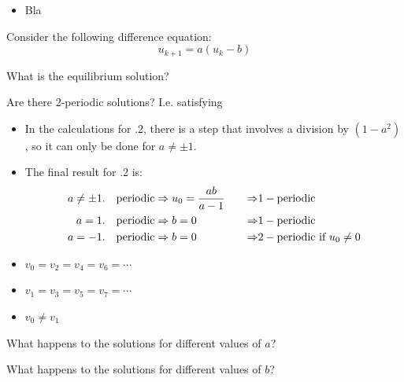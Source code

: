 \begin{lesson}

	\begin{itemize}
		\item Bla
	\end{itemize}
	

\end{lesson}




\question 
	Consider the following difference equation:
		$$u_{k+1} = a(u_k - b)$$

	\begin{parts}
		\item What is the equilibrium solution?
		\item Are there 2-periodic solutions? I.e. satisfying
\begin{annotation}
	\begin{goals}
		\begin{itemize}
			\item In the calculations for .2, there is a step that involves a division by $(1-a^2)$, so it can only be done for $a \neq \pm 1$.
			\item The final result for .2 is:
			\begin{align*}
				a \neq \pm1. & \quad {\rm periodic} \Rightarrow u_0 = \frac{ab}{a-1} \quad & \Rightarrow & 1-{\rm periodic} \\
				a = 1. & \quad {\rm periodic} \Rightarrow b=0  & \Rightarrow & 1-{\rm periodic} \\
				a = -1. & \quad {\rm periodic} \Rightarrow b=0  & \Rightarrow & 2-\text{periodic if } u_0\neq 0
			\end{align*}
		\end{itemize}
	\end{goals}
\end{annotation}
		\begin{itemize}
			\item $v_0=v_2=v_4=v_6=\cdots$
			\item $v_1=v_3=v_5=v_7=\cdots$
			\item $v_0\neq v_1$
		\end{itemize} 
		\item What happens to the solutions for different values of $a$?
		\item What happens to the solutions for different values of $b$?
	\end{parts}






